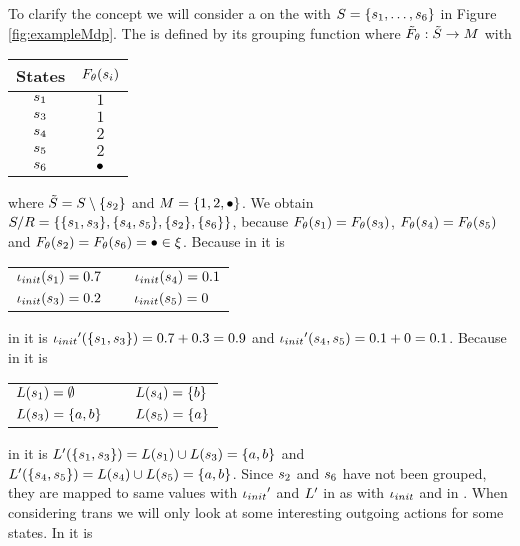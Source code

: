 \documentclass[preview]{standalone}
\begin{document}
\begin{exmp}
To clarify the concept we will consider a \viewN \view on the \mdpN \mdp with ${S} = \{{s}_1, \dots, {s}_6\}$ in Figure \ref{fig:exampleMdp}. The \view \viewN is defined by its grouping function \grpfct where ${\tilde{F}_{{\theta}}} : {\tilde{{S}}} \to {\ensuremath{{M}}}$ with 

\begin{table}[h]
	\centering
	\begin{tabular}{c|c}
		States & ${F_{{\theta}}}({s}_i)$\\
		\hline
		${s}_1$ & $1$\\
		${s}_3$ & $1$\\
		${s}_4$ & $2$\\
		${s}_5$ & $2$\\
		${s}_6$ & ${\bullet}$\\
	\end{tabular}
\end{table}
where ${\tilde{{S}}} = {S} \setminus \{{s}_2\}$ and ${{M}} = \{1,2,{\bullet}\}$. We obtain ${{{S}}/{R}} = \{\{{s}_1, {s}_3\}, \{{s}_4, {s}_5\}, \{{s}_2\}, \{{s}_6\}\}$, because ${F_{{\theta}}}({s}_1) = {F_{{\theta}}}({s}_3)$, ${F_{{\theta}}}({s}_4) = {F_{{\theta}}}({s}_5)$ and ${F_{{\theta}}}({s}_2) = {F_{{\theta}}}({s}_6) = {\bullet} \in {\xi}$. Because in \chgph it is 
\begin{center}
	\begin{tabular}{lcl}
		${\iota_{init}}({s}_1) = 0.7$ & \quad\quad & ${\iota_{init}}({s}_4) = 0.1$\\
		${\iota_{init}}({s}_3) = 0.2$ & \quad\quad & ${\iota_{init}}({s}_5) = 0$\\
	\end{tabular}
\end{center}
in \view it is ${\iota_{init}}'(\{{s}_1,{s}_3\}) = 0.7 + 0.3 = 0.9$ and ${\iota_{init}}'({s}_4, {s}_5) = 0.1 + 0 = 0.1$. Because in \chgph it is
\begin{center}
	\begin{tabular}{lcl}
	${L}({s}_1) = \emptyset$& \quad\quad & ${L}({s}_4) = \{b\}$\\
	${L}({s}_3) = \{a,b\}$ & \quad\quad & ${L}({s}_5) = \{a\}$\\
	\end{tabular}
\end{center}
in \view it is ${L}'(\{{s}_1, {s}_3\}) = {L}({s}_1) \cup {L}({s}_3) = \{a,b\}$ and ${L}'(\{{s}_4, {s}_5\}) = {L}({s}_4) \cup {L}({s}_5) = \{a,b\}$. Since ${s}_2$ and ${s}_6$ have not been grouped, they are mapped to same values with ${\iota_{init}}'$ and ${L}'$ in \view as with ${\iota_{init}}$ and  in \chgph. When considering trans we will only look at some interesting outgoing actions for some states. In \chgph it is 

\end{exmp}
\end{document}

